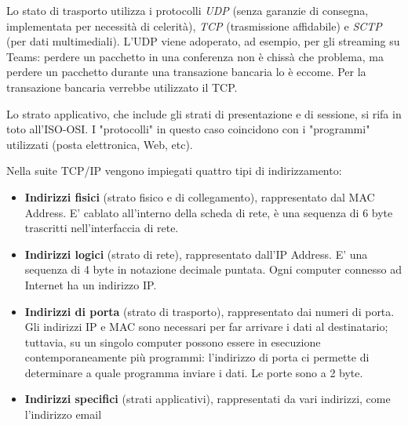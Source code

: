     \vspace{3mm}

    Lo stato di trasporto utilizza i protocolli \textit{UDP} (senza garanzie di consegna, implementata per necessità di celerità), \textit{TCP} (trasmissione affidabile) e \textit{SCTP} (per dati multimediali). L'UDP viene adoperato, ad esempio, per gli streaming su Teams: perdere un pacchetto in una conferenza non è chissà che problema, ma perdere un pacchetto durante una transazione bancaria lo è eccome. Per la transazione bancaria verrebbe utilizzato il TCP.

    \vspace{3mm}

    Lo strato applicativo, che include gli strati di presentazione e di sessione, si rifa in toto all'ISO-OSI. I "protocolli" in questo caso coincidono con i "programmi" utilizzati (posta elettronica, Web, etc).

    \vspace{3mm}

    Nella suite TCP/IP vengono impiegati quattro tipi di indirizzamento:

    \begin{itemize}
        \item 
            \textbf{Indirizzi fisici} (strato fisico e di collegamento), rappresentato dal MAC Address. E' cablato all'interno della scheda di rete, è una sequenza di 6 byte trascritti nell'interfaccia di rete.
        
        \item
            \textbf{Indirizzi logici} (strato di rete), rappresentato dall'IP Address. E' una sequenza di 4 byte in notazione decimale puntata. Ogni computer connesso ad Internet ha un indirizzo IP.
        
        \item
            \textbf{Indirizzi di porta }(strato di trasporto), rappresentato dai numeri di porta. Gli indirizzi IP e MAC sono necessari per far arrivare i dati al destinatario; tuttavia, su un singolo computer possono essere in esecuzione contemporaneamente più programmi: l'indirizzo di porta ci permette di determinare a quale programma inviare i dati. Le porte sono a 2 byte.
        
        \item
            \textbf{Indirizzi specifici} (strati applicativi), rappresentati da vari indirizzi, come l'indirizzo email
    \end{itemize}
